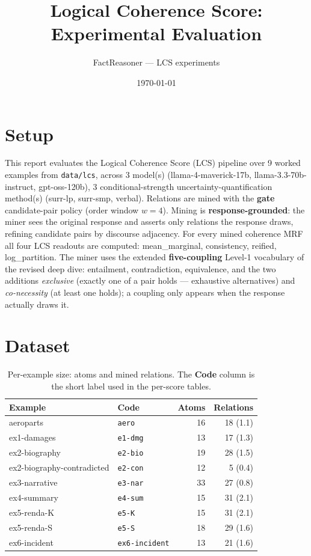 \documentclass[11pt]{article}
\title{Logical Coherence Score: Experimental Evaluation}
\author{FactReasoner --- LCS experiments}
\date{\today}
\begin{document}
\maketitle

\section{Setup}

This report evaluates the Logical Coherence Score (LCS) pipeline over 9 worked examples from \texttt{data/lcs}, across 3 model(s) (llama-4-maverick-17b, llama-3.3-70b-instruct, gpt-oss-120b), 3 conditional-strength uncertainty-quantification method(s) (surr-lp, surr-smp, verbal). Relations are mined with the \textbf{gate} candidate-pair policy (order window $w=4$). Mining is \textbf{response-grounded}: the miner sees the original response and asserts only relations the response draws, refining candidate pairs by discourse adjacency. For every mined coherence MRF all four LCS readouts are computed: mean\_marginal, consistency, reified, log\_partition. The miner uses the extended \textbf{five-coupling} Level-1 vocabulary of the revised deep dive: entailment, contradiction, equivalence, and the two additions \emph{exclusive} (exactly one of a pair holds --- exhaustive alternatives) and \emph{co-necessity} (at least one holds); a coupling only appears when the response actually draws it. 

\section{Dataset}

\begin{table}[htbp]
\centering
\small
\caption{Per-example size: atoms and mined relations. The \textbf{Code} column is the short label used in the per-score tables.}
\label{tab:coverage}
\begin{tabular}{llrr}
\toprule
Example & Code & Atoms & Relations \\
\midrule
aeroparts & \texttt{aero} & 16 & 18 (1.1) \\
ex1-damages & \texttt{e1-dmg} & 13 & 17 (1.3) \\
ex2-biography & \texttt{e2-bio} & 19 & 28 (1.5) \\
ex2-biography-contradicted & \texttt{e2-con} & 12 & 5 (0.4) \\
ex3-narrative & \texttt{e3-nar} & 33 & 27 (0.8) \\
ex4-summary & \texttt{e4-sum} & 15 & 31 (2.1) \\
ex5-renda-K & \texttt{e5-K} & 15 & 31 (2.1) \\
ex5-renda-S & \texttt{e5-S} & 18 & 29 (1.6) \\
ex6-incident & \texttt{ex6-incident} & 13 & 21 (1.6) \\
\bottomrule
\end{tabular}
\end{table}
\end{document}
